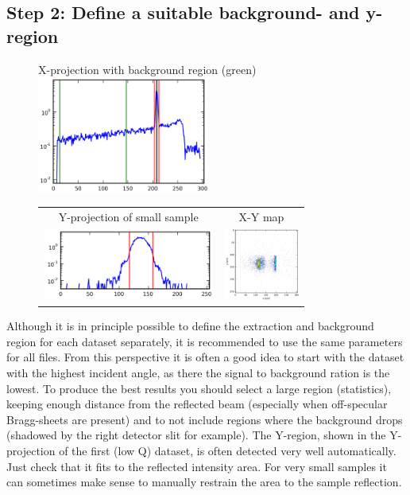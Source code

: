   
  \subsection{Step 2: Define a suitable background- and y-region}
    \begin{figure}
    \centering
      X-projection with background region (green)\\
      \includegraphics[width=160pt]{screenshots/background.png}
    \begin{tabular}{cc}
        Y-projection of small sample & X-Y map \\
      \includegraphics[width=160pt]{screenshots/yregion.png} & \includegraphics[width=70pt]{screenshots/yregionmap.png}
    \end{tabular}     
    \end{figure}
  
    Although it is in principle possible to define the extraction and background region for each dataset separately, it is recommended to use the same parameters for all files.
    From this perspective it is often a good idea to start with the dataset with the highest incident angle, as there the signal to background ration is the lowest.
    To produce the best results you should select a large region (statistics), keeping enough distance from the reflected beam (especially when off-specular Bragg-sheets are present) and to not include regions where the background drops (shadowed by the right detector slit for example).
    The Y-region, shown in the Y-projection of the first (low Q) dataset, is often detected very well automatically.
    Just check that it fits to the reflected intensity area. 
    For very small samples it can sometimes make sense to manually restrain the area to the sample reflection.
  
